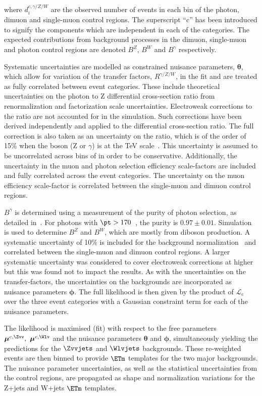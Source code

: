 where $d^{c,\gamma/Z/W}_{i}$ are the observed number of events in each bin of the photon, dimuon and single-muon control regions.
The superscript ``c'' has been introduced to signify the components which are independent in each of the categories. 
The expected contributions from background processes in the dimuon, single-muon and photon control regions are denoted $B^{Z}$, $B^{W}$ and 
$B^{\gamma}$ respectively.

Systematic uncertainties are modelled as constrained nuisance parameters, $\boldsymbol{\theta}$, which allow for variation of 
the transfer factors, $R^{\gamma/Z/W}$, in the fit and are treated as fully correlated between event categories.
These include theoretical uncertainties on the photon to Z differential cross-section ratio from renormalization and factorization scale uncertainties. 
Electroweak corrections to the ratio are not accounted for in the simulation. Such corrections 
have been derived independently 
and applied to the differential cross-section ratio. The full correction is also taken as an uncertainty on the ratio, 
which is of the order of 15\% when the boson (Z or $\gamma$) \pt is at the TeV scale~\cite{Kuhn:2005gv}. This uncertainty is assumed to be uncorrelated 
across bins of \ETm in order to be conservative. 
Additionally, the uncertainty in the muon and photon selection 
efficiency scale-factors are included and fully correlated across the event categories. The uncertainty on the 
muon efficiency scale-factor is correlated between the single-muon and dimuon control regions.

$B^{\gamma}$ is determined using a measurement of the purity of photon selection, as detailed in~\citep{photon_purity}. 
For photons with $\pt> 170$~\gev, the purity is $0.97\pm0.01$. 
Simulation is used to determine $B^{Z}$ and $B^{W}$, which are mostly from 
diboson production. A systematic uncertainty of 10\% is included for the background normalization~\cite{tagkey2015250} and correlated between the 
single-muon and dimuon control regions. A larger systematic uncertainty was considered to cover electroweak corrections at higher \ETm but this was found 
not to impact the results. As with the uncertainties on the transfer-factors, the uncertainties on the backgrounds 
are incorporated as nuisance parameters $\boldsymbol{\phi}$.
The full likelihood is then given by the product of $\mathcal{L}_{\textrm{c}}$ over the three event categories with a Gaussian constraint term for each of the nuisance parameters.

The likelihood is maximised (fit) with respect to the free parameters $\boldsymbol{\mu}^{c,\Zvv},~\boldsymbol{\mu}^{c,\Wlv}$ 
and the nuisance parameters $\boldsymbol{\theta}$ and $\boldsymbol{\phi}$, simultaneously yielding the predictions for the $\Zvvjets$ and $\Wlvjets$ backgrounds.
These re-weighted events are then binned to provide $\ETm$ templates for the two major backgrounds.
The nuisance parameter uncertainties, as well as the statistical uncertainties from the control regions, are propagated as shape and normalization 
variations for the Z+jets and W+jets $\ETm$ templates.  

